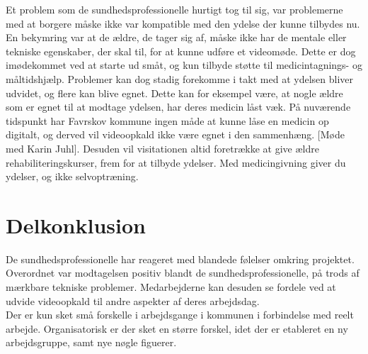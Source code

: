 Et problem som de sundhedsprofessionelle hurtigt tog til sig, var problemerne med at borgere måske ikke var kompatible med den ydelse der kunne tilbydes nu. En bekymring var at de ældre, de tager sig af, måske ikke har de mentale eller tekniske egenskaber, der skal til, for at kunne udføre et videomøde. Dette er dog imødekommet ved at starte ud småt, og kun tilbyde støtte til medicintagnings- og måltidshjælp. Problemer kan dog stadig forekomme i takt med at ydelsen bliver udvidet, og flere kan blive egnet. Dette kan for eksempel være, at nogle ældre som er egnet til at modtage ydelsen, har deres medicin låst væk. På nuværende tidspunkt har Favrskov kommune ingen måde at kunne låse en medicin op digitalt, og derved vil videoopkald ikke være egnet i den sammenhæng. [Møde med Karin Juhl]. Desuden vil visitationen altid foretrække at give ældre rehabiliteringskurser, frem for at tilbyde ydelser. Med medicingivning giver du ydelser, og ikke selvoptræning. \\

\section{Delkonklusion}
De sundhedsprofessionelle har reageret med blandede følelser omkring projektet. Overordnet var modtagelsen positiv blandt de sundhedsprofessionelle, på trods af mærkbare tekniske problemer. Medarbejderne kan desuden se fordele ved at udvide videoopkald til andre aspekter af deres arbejdsdag.  \\
Der er kun sket små forskelle i arbejdsgange i kommunen i forbindelse med reelt arbejde. Organisatorisk er der sket en større forskel, idet der er etableret en ny arbejdsgruppe, samt nye nøgle figuerer. \\
